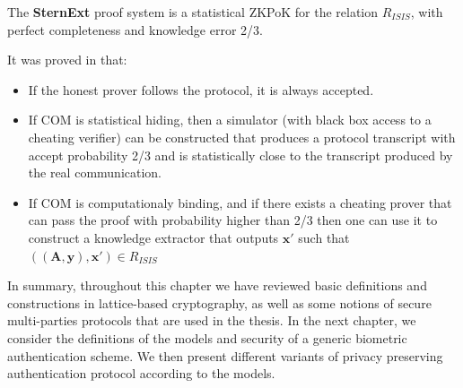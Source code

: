 \begin{theorem}
   The \textbf{SternExt} proof system is a statistical ZKPoK for the relation $R_{ISIS}$, with perfect completeness and knowledge error 2/3.
\end{theorem}

It was proved in \cite{ling2013improved} that:
\begin{itemize}
\item If the honest prover follows the protocol, it is always accepted.
\item If COM is statistical hiding, then a simulator (with black box access to a
  cheating verifier) can be constructed that produces a protocol transcript with
  accept probability 2/3 and is statistically close to the transcript produced
  by the real communication.
\item If COM is computationaly binding, and if there exists a cheating prover
  that can pass the proof with probability higher than 2/3 then one can use it
  to construct a knowledge extractor that outputs $\mathbf{x'}$ such that
  $(\mathbf{(A,y),x'}) \in R_{ISIS}$
\end{itemize}


In summary, throughout this chapter we have reviewed basic definitions and
constructions in lattice-based cryptography, as well as some notions of secure
multi-parties protocols that are used in the thesis. In the next chapter, we
consider the definitions of the models and security of a generic biometric
authentication scheme. We then present different variants of privacy preserving
authentication protocol according to the models.

